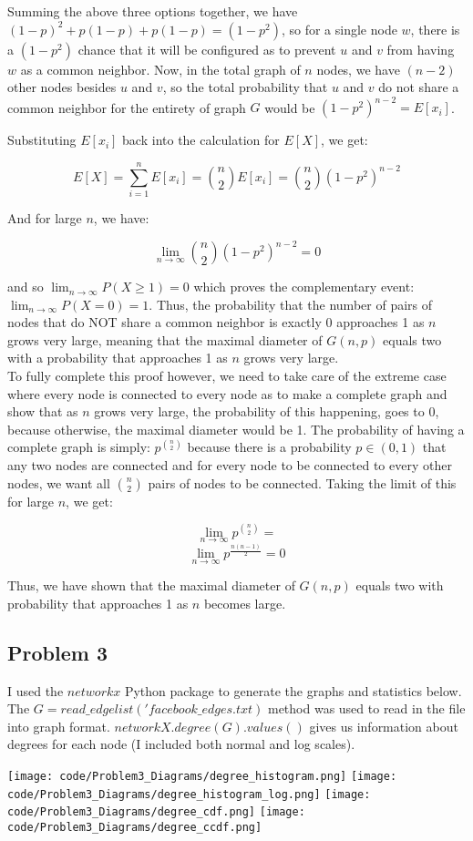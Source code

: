 \documentclass[12 pt]{article}
\begin{document}
	\noindent Summing the above three options together, we have $(1-p)^2 + p(1-p) + p(1-p) = (1-p^2)$, so for a single node $w$, there is a $(1-p^2)$ chance that it will be configured as to prevent $u$ and $v$ from having $w$ as a common neighbor. Now, in the total graph of $n$ nodes, we have $(n-2)$ other nodes besides $u$ and $v$, so the total probability that $u$ and $v$ do not share a common neighbor for the entirety of graph $G$ would be $(1-p^2)^{n-2} = E[x_i]$.
	
	\noindent Substituting $E[x_i]$ back into the calculation for $E[X]$, we get:
	
	\[E[X] = \sum_{i=1}^n E[x_i] = {n \choose 2} E[x_i] = {n\choose2}(1-p^2)^{n-2}\]
	
	\noindent And for large $n$, we have:
	
	\[\lim_{n\rightarrow \infty} {n\choose2}(1-p^2)^{n-2} = 0\]
	
	\noindent and so $\lim_{n \rightarrow \infty} P(X \geq 1) = 0$ which proves the complementary event: $\lim_{n \rightarrow \infty} P(X = 0) = 1$. Thus, the probability that the number of pairs of nodes that do NOT share a common neighbor is exactly 0 approaches 1 as $n$ grows very large, meaning that the maximal diameter of $G(n,p)$ equals two with a probability that approaches 1 as $n$ grows very large.\\
	
	\noindent To fully complete this proof however, we need to take care of the extreme case where every node is connected to every node as to make a complete graph and show that as $n$ grows very large, the probability of this happening, goes to 0, because otherwise, the maximal diameter would be 1. The probability of having a complete graph is simply: $p^{n \choose 2}$ because there is a probability $p \in (0,1)$ that any two nodes are connected and for every node to be connected to every other nodes, we want all ${n \choose 2}$ pairs of nodes to be connected. Taking the limit of this for large $n$, we get:
	
	\[\lim_{n\rightarrow \infty} p^{n \choose 2} = \]
	\[\lim_{n\rightarrow \infty} p^{\frac{n(n-1)}{2}} = 0\]
	
	\noindent Thus, we have shown that the maximal diameter of $G(n, p)$ equals two with probability that approaches 1 as $n$ becomes large.\\
	
	\subsection*{Problem 3}
	\noindent I used the $networkx$ Python package to generate the graphs and statistics below. The $G=read\_edgelist('facebook\_edges.txt)$ method was used to read in the file into graph format. $networkX.degree(G).values()$ gives us information about degrees for each node (I included both normal and log scales).
	\begin{center}
		\texttt{[image: code/Problem3\_Diagrams/degree\_histogram.png]}
		\texttt{[image: code/Problem3\_Diagrams/degree\_histogram\_log.png]}
		\texttt{[image: code/Problem3\_Diagrams/degree\_cdf.png]}
		\texttt{[image: code/Problem3\_Diagrams/degree\_ccdf.png]}
	\end{center}
	
\end{document}
